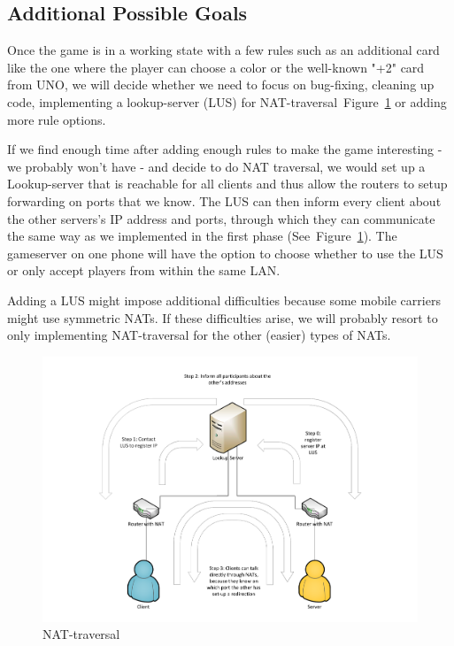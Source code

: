 \documentclass{report}
\newcommand{\lfig}[1]{\label{fig:#1}}
\newcommand{\rfig}[1]{Figure~\ref{fig:#1}}
\begin{document}
\subsection{Additional Possible Goals}
Once the game is in a working state with a few rules such as an additional card like the one where the player can choose a color or the well-known "+2" card from UNO, we will decide whether we need to focus on bug-fixing, cleaning up code, implementing a lookup-server (LUS) for NAT-traversal~\rfig{nat} or adding more rule options. 

If we find enough time after adding enough rules to make the game interesting - we probably won't have - and decide to do NAT traversal, we would set up a Lookup-server that is reachable for all clients and thus allow the routers to setup forwarding on ports that we know. The LUS can then inform every client about the other servers's IP address and ports, through which they can communicate the same way as we implemented in the first phase (See~\rfig{nat}). The gameserver on one phone will have the option to choose whether to use the LUS or only accept players from within the same LAN.

Adding a LUS might impose additional difficulties because some mobile carriers might use symmetric NATs. If these difficulties arise, we will probably resort to only implementing NAT-traversal for the other (easier) types of NATs.

\begin{figure}[h]
	\centering
    \includegraphics[width=\columnwidth]{NATholepunching.pdf}
    \vspace{-5mm} %
	\caption{NAT-traversal}
	\lfig{nat}
\end{figure}
\end{document}
